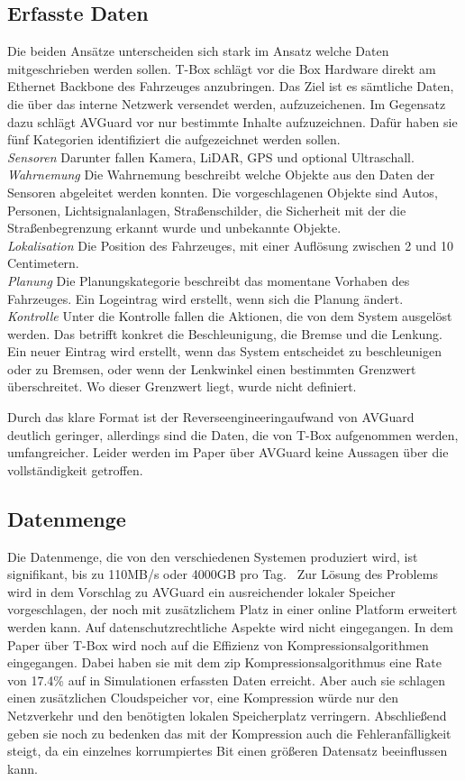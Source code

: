 \documentclass[conference,compsoc,final,a4paper]{IEEEtran}
\begin{document}
\subsection{Erfasste Daten}

Die beiden Ansätze unterscheiden sich stark im Ansatz welche Daten mitgeschrieben werden sollen.
T-Box schlägt vor die Box Hardware direkt am Ethernet Backbone des Fahrzeuges anzubringen.
Das Ziel ist es sämtliche Daten, die über das interne Netzwerk versendet werden, aufzuzeichenen.
Im Gegensatz dazu schlägt AVGuard vor nur bestimmte Inhalte aufzuzeichnen.
Dafür haben sie fünf Kategorien identifiziert die aufgezeichnet werden sollen.\\
\emph{Sensoren} Darunter fallen Kamera, \ac{LiDAR}, \ac{GPS} und optional Ultraschall.\\
\emph{Wahrnemung} Die Wahrnemung beschreibt welche Objekte aus den Daten der Sensoren abgeleitet werden konnten.
  Die vorgeschlagenen Objekte sind Autos, Personen, Lichtsignalanlagen, Straßenschilder,
  die Sicherheit mit der die Straßenbegrenzung erkannt wurde und unbekannte Objekte.\\
\emph{Lokalisation} Die Position des Fahrzeuges, mit einer Auflösung zwischen 2 und 10 Centimetern.\\
\emph{Planung} Die Planungskategorie beschreibt das momentane Vorhaben des Fahrzeuges.
  Ein Logeintrag wird erstellt, wenn sich die Planung ändert.\\
\emph{Kontrolle} Unter die Kontrolle fallen die Aktionen, die von dem System ausgelöst werden.
  Das betrifft konkret die Beschleunigung, die Bremse und die Lenkung. 
  Ein neuer Eintrag wird erstellt, wenn das System entscheidet zu beschleunigen oder zu Bremsen,
  oder wenn der Lenkwinkel einen bestimmten Grenzwert überschreitet. Wo dieser Grenzwert liegt, wurde nicht definiert.

Durch das klare Format ist der Reverseengineeringaufwand von AVGuard deutlich geringer, allerdings sind die Daten, die
von T-Box aufgenommen werden, umfangreicher. Leider werden im Paper über AVGuard keine Aussagen über die vollständigkeit getroffen.

\subsection{Datenmenge}
Die Datenmenge, die von den verschiedenen Systemen produziert wird, ist signifikant, bis zu 110MB/s oder 4000GB pro Tag.~\cite{Hoque_2021a}
Zur Lösung des Problems wird in dem Vorschlag zu AVGuard ein ausreichender lokaler Speicher vorgeschlagen, der noch mit
zusätzlichem Platz in einer online Platform erweitert werden kann. Auf datenschutzrechtliche Aspekte wird nicht eingegangen.
In dem Paper über T-Box wird noch auf die Effizienz von Kompressionsalgorithmen eingegangen. Dabei haben sie mit dem zip Kompressionsalgorithmus
eine Rate von 17.4\% auf in Simulationen erfassten Daten erreicht. Aber auch sie schlagen einen zusätzlichen Cloudspeicher vor,
eine Kompression würde nur den Netzverkehr und den benötigten lokalen Speicherplatz verringern.
Abschließend geben sie noch zu bedenken das mit der Kompression auch die Fehleranfälligkeit steigt, da ein einzelnes korrumpiertes Bit
einen größeren Datensatz beeinflussen kann.
\end{document}
